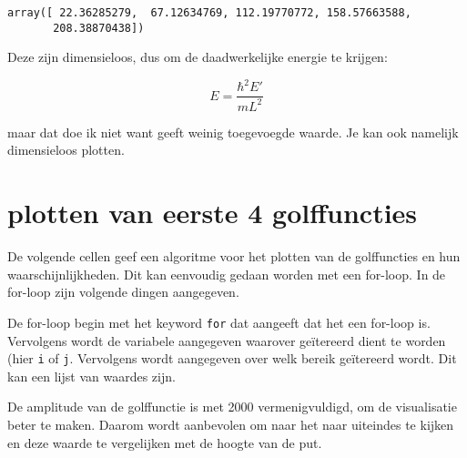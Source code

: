 \documentclass[11pt]{article}
\makeatletter
\newcommand{\boxspacing}{\kern\kvtcb@left@rule\kern\kvtcb@boxsep}
\newcommand{\prompt}[4]{
        {\ttfamily\llap{{\color{#2}[#3]:\hspace{3pt}#4}}\vspace{-\baselineskip}}
    }
\makeatother
\begin{document}
            \begin{tcolorbox}[breakable, size=fbox, boxrule=.5pt, pad at break*=1mm, opacityfill=0]
\prompt{Out}{outcolor}{19}{\boxspacing}
\begin{Verbatim}[commandchars=\\\{\}]
array([ 22.36285279,  67.12634769, 112.19770772, 158.57663588,
       208.38870438])
\end{Verbatim}
\end{tcolorbox}
        
    Deze zijn dimensieloos, dus om de daadwerkelijke energie te krijgen:

\[ E = \frac{\hbar^2 E'}{m L^2} \]

maar dat doe ik niet want geeft weinig toegevoegde waarde. Je kan ook
namelijk dimensieloos plotten.

    \hypertarget{plotten-van-eerste-4-golffuncties}{%
\section{plotten van eerste 4
golffuncties}\label{plotten-van-eerste-4-golffuncties}}

    De volgende cellen geef een algoritme voor het plotten van de
golffuncties en hun waarschijnlijkheden. Dit kan eenvoudig gedaan worden
met een for-loop. In de for-loop zijn volgende dingen aangegeven.

De for-loop begin met het keyword \texttt{for} dat aangeeft dat het een
for-loop is. Vervolgens wordt de variabele aangegeven waarover
geïtereerd dient te worden (hier \texttt{i} of \texttt{j}. Vervolgens
wordt aangegeven over welk bereik geïtereerd wordt. Dit kan een lijst
van waardes zijn.

De amplitude van de golffunctie is met 2000 vermenigvuldigd, om de
visualisatie beter te maken. Daarom wordt aanbevolen om naar het naar
uiteindes te kijken en deze waarde te vergelijken met de hoogte van de
put.
\end{document}
